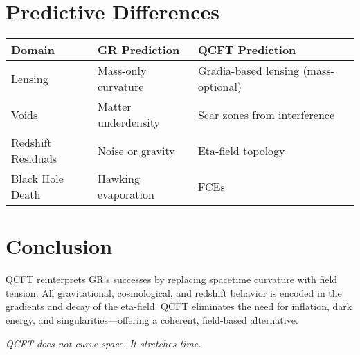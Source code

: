 \documentclass[12pt]{article}
\begin{document}
\section{Predictive Differences}

\begin{tabular}{@{}llll@{}}
\toprule
Domain & GR Prediction & QCFT Prediction \\
\midrule
Lensing & Mass-only curvature & Gradia-based lensing (mass-optional) \\
Voids & Matter underdensity & Scar zones from interference \\
Redshift Residuals & Noise or gravity & Eta-field topology \\
Black Hole Death & Hawking evaporation & FCEs \\
\bottomrule
\end{tabular}

\section*{Conclusion}

QCFT reinterprets GR’s successes by replacing spacetime curvature with field tension. All gravitational, cosmological, and redshift behavior is encoded in the gradients and decay of the eta-field. QCFT eliminates the need for inflation, dark energy, and singularities—offering a coherent, field-based alternative.

\begin{center}
\textit{QCFT does not curve space. It stretches time.}
\end{center}
\end{document}
